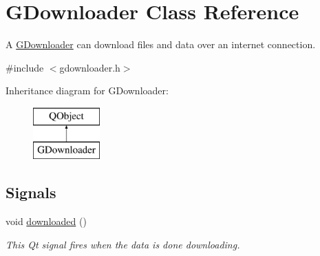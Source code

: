 \hypertarget{classGDownloader}{}\section{G\+Downloader Class Reference}
\label{classGDownloader}


A \mbox{\hyperlink{classGDownloader}{G\+Downloader}} can download files and data over an internet connection.  




{\ttfamily \#include $<$gdownloader.\+h$>$}

Inheritance diagram for G\+Downloader\+:\begin{figure}[H]
\begin{center}
\leavevmode
\includegraphics[height=2.000000cm]{classGDownloader}
\end{center}
\end{figure}
\subsection*{Signals}
\begin{DoxyCompactItemize}
\item 
void \mbox{\hyperlink{classGDownloader_abb5cf1dbe464e3dc8943c261934b9a64}{downloaded}} ()
\begin{DoxyCompactList}\small\item\em This Qt signal fires when the data is done downloading. \end{DoxyCompactList}\end{DoxyCompactItemize}
